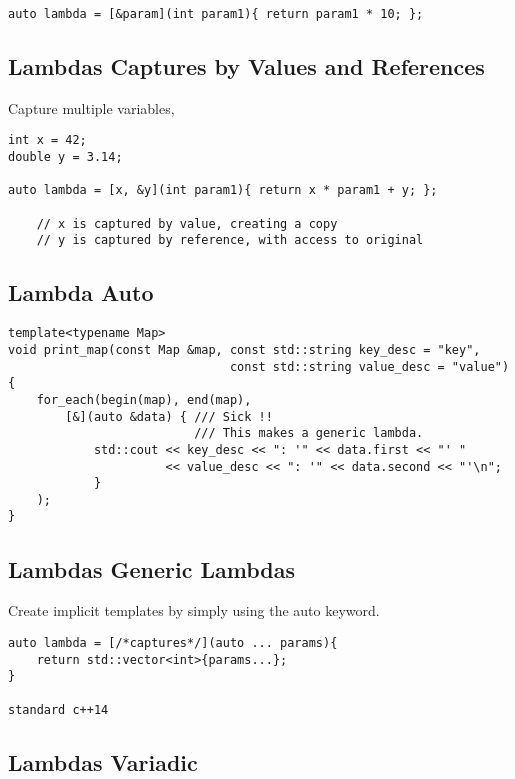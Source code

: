 \documentclass[openany]{report}
\begin{document}
\begin{verbatim}
auto lambda = [&param](int param1){ return param1 * 10; };
\end{verbatim}

\subsection{Lambdas Captures by Values and References}

Capture multiple variables, 

\begin{verbatim}
int x = 42;
double y = 3.14;

auto lambda = [x, &y](int param1){ return x * param1 + y; };

    // x is captured by value, creating a copy
    // y is captured by reference, with access to original
\end{verbatim}

\subsection{Lambda Auto}
\begin{verbatim}
template<typename Map>
void print_map(const Map &map, const std::string key_desc = "key",
                               const std::string value_desc = "value")
{
    for_each(begin(map), end(map),
        [&](auto &data) { /// Sick !!
                          /// This makes a generic lambda.
            std::cout << key_desc << ": '" << data.first << "' "
                      << value_desc << ": '" << data.second << "'\n";
            }
    );
}
\end{verbatim}

\subsection{Lambdas Generic Lambdas}

Create implicit templates by simply using the auto keyword.

\begin{verbatim}
auto lambda = [/*captures*/](auto ... params){
    return std::vector<int>{params...};
}

standard c++14
\end{verbatim}

\subsection{Lambdas Variadic}
\end{document}
